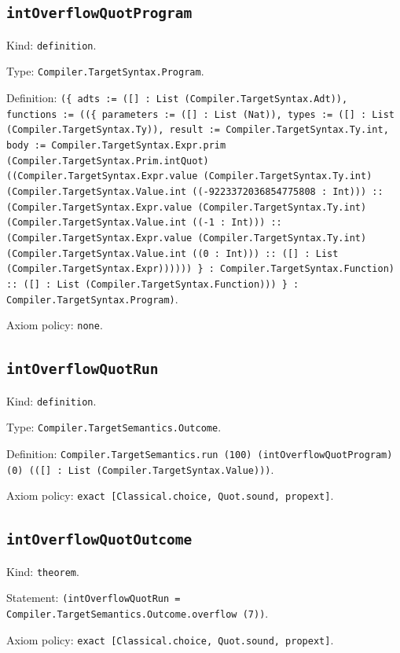 \documentclass[11pt]{article}
\begin{document}
\subsection*{\texttt{intOverflowQuotProgram}}
\noindent Kind: \texttt{definition}.\par
\noindent Type: \texttt{Compiler.TargetSyntax.Program}.\par
\noindent Definition: \texttt{(\{ adts := ([] : List (Compiler.TargetSyntax.Adt)), functions := ((\{ parameters := ([] : List (Nat)), types := ([] : List (Compiler.TargetSyntax.Ty)), result := Compiler.TargetSyntax.Ty.int, body := Compiler.TargetSyntax.Expr.prim (Compiler.TargetSyntax.Prim.intQuot) ((Compiler.TargetSyntax.Expr.value (Compiler.TargetSyntax.Ty.int) (Compiler.TargetSyntax.Value.int ((-9223372036854775808 : Int))) :: (Compiler.TargetSyntax.Expr.value (Compiler.TargetSyntax.Ty.int) (Compiler.TargetSyntax.Value.int ((-1 : Int))) :: (Compiler.TargetSyntax.Expr.value (Compiler.TargetSyntax.Ty.int) (Compiler.TargetSyntax.Value.int ((0 : Int))) :: ([] : List (Compiler.TargetSyntax.Expr)))))) \} : Compiler.TargetSyntax.Function) :: ([] : List (Compiler.TargetSyntax.Function))) \} : Compiler.TargetSyntax.Program)}.\par
\noindent Axiom policy: \texttt{none}.\par
\subsection*{\texttt{intOverflowQuotRun}}
\noindent Kind: \texttt{definition}.\par
\noindent Type: \texttt{Compiler.TargetSemantics.Outcome}.\par
\noindent Definition: \texttt{Compiler.TargetSemantics.run (100) (intOverflowQuotProgram) (0) (([] : List (Compiler.TargetSyntax.Value)))}.\par
\noindent Axiom policy: \texttt{exact [Classical.choice, Quot.sound, propext]}.\par
\subsection*{\texttt{intOverflowQuotOutcome}}
\noindent Kind: \texttt{theorem}.\par
\noindent Statement: \texttt{(intOverflowQuotRun = Compiler.TargetSemantics.Outcome.overflow (7))}.\par
\noindent Axiom policy: \texttt{exact [Classical.choice, Quot.sound, propext]}.\par
\end{document}
